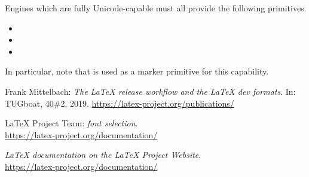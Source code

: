 \documentclass{ltnews}
\begin{document}
Engines which are fully Unicode-capable must all provide the following
primitives
\begin{itemize}
  \item {}
  \item {}
  \item {}
\end{itemize}
In particular, note that  is used as a marker primitive for
this capability.




\begin{thebibliography}{9}


 Frank Mittelbach:
  \emph{The
  \LaTeX{} release workflow and the \LaTeX{} dev formats}.
  In: TUGboat, 40\#2, 2019.
  \url{https://latex-project.org/publications/}

 \LaTeX{} Project Team:
  \emph{\LaTeXe{} font selection}.\\
  \url{https://latex-project.org/documentation/}

  \emph{\LaTeX{} documentation on the \LaTeX{} Project Website}.\\
  \url{https://latex-project.org/documentation/}


\end{thebibliography}
\end{document}

